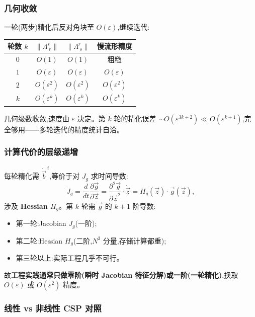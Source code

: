 \documentclass[11pt,a4paper]{article}
\newcommand{\Jg}{J_{\!g}}
\newcommand{\diff}[2]{\dfrac{d #1}{d #2}}
\newcommand{\pdiff}[2]{\dfrac{\partial #1}{\partial #2}}
\begin{document}
\subsubsection*{几何收敛}

一轮(两步)精化后反对角块至 $O(\varepsilon)$,继续迭代:
\begin{center}
\begin{tabular}{cccc}
\hline
轮数 $k$ & $\|\Lambda^{s}_{\;r}\|$ & $\|\Lambda^{r}_{\;s}\|$ & 慢流形精度\\
\hline
$0$ & $O(1)$ & $O(1)$ & 粗糙\\
$1$ & $O(\varepsilon)$ & $O(\varepsilon)$ & $O(\varepsilon)$\\
$2$ & $O(\varepsilon^2)$ & $O(\varepsilon^2)$ & $O(\varepsilon^2)$\\
$k$ & $O(\varepsilon^k)$ & $O(\varepsilon^k)$ & $O(\varepsilon^k)$\\
\hline
\end{tabular}
\end{center}
几何级数收敛,速度由 $\varepsilon$ 决定。第 $k$ 轮的精化误差 $\sim O(\varepsilon^{3k+2})\ll O(\varepsilon^{k+1})$,完全够用——多轮迭代的精度统计自洽。

\subsubsection*{计算代价的层级递增}

每轮精化需 $\dot{\vec b}^{\,i}$,等价于对 $\Jg$ 求时间导数:
\begin{equation}
\dot\Jg=\diff{}{t}\pdiff{\vec g}{\vec z}=\pdiff{^2\vec g}{\vec z^2}\cdot\dot{\vec z}=H_g(\vec z)\cdot\vec g(\vec z),
\end{equation}
涉及 \textbf{Hessian $H_g$}。第 $k$ 轮需 $\vec g$ 的 $k+1$ 阶导数:
\begin{itemize}[leftmargin=2em]
\item 第一轮:Jacobian $\Jg$(一阶);
\item 第二轮:Hessian $H_g$(二阶,$N^3$ 分量,存储计算都重);
\item 第三轮以上:实际工程几乎不可行。
\end{itemize}
故\textbf{工程实践通常只做零阶(瞬时 Jacobian 特征分解)或一阶(一轮精化)},换取 $O(\varepsilon)$ 或 $O(\varepsilon^2)$ 精度。

\subsubsection*{线性 vs 非线性 CSP 对照}
\end{document}
